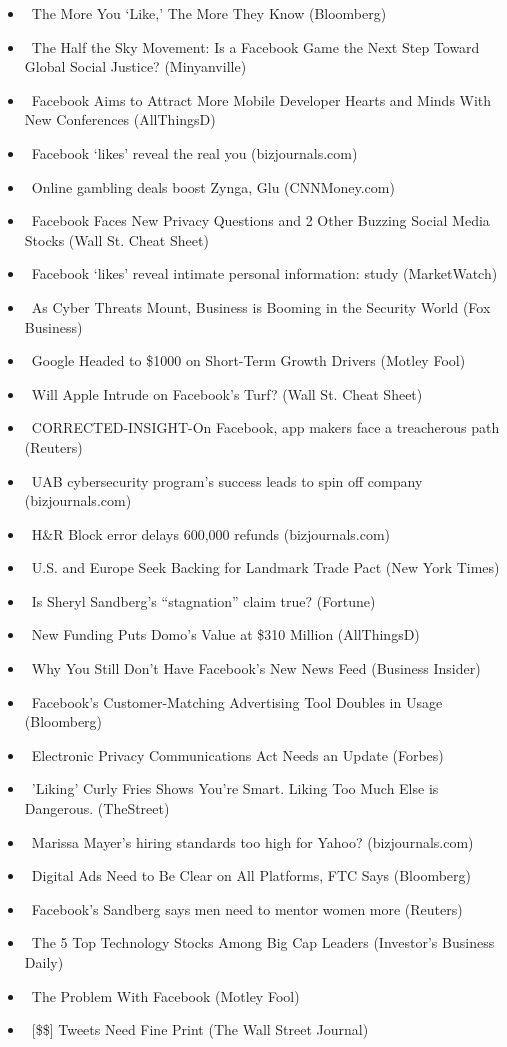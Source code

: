 \documentclass[11pt,asymmetric]{article}
\begin{document}
\begin{itemize}
\item\ The More You `Like,' The More They Know (Bloomberg)
\item\ The Half the Sky Movement: Is a Facebook Game the Next Step Toward Global Social Justice? (Minyanville)
\item\ Facebook Aims to Attract More Mobile Developer Hearts and Minds With New Conferences (AllThingsD)
\item\ Facebook `likes' reveal the real you (bizjournals.com)
\item\ Online gambling deals boost Zynga, Glu (CNNMoney.com)
\item\ Facebook Faces New Privacy Questions and 2 Other Buzzing Social Media Stocks (Wall St. Cheat Sheet)
\item\ Facebook `likes' reveal intimate personal information: study (MarketWatch)
\item\ As Cyber Threats Mount, Business is Booming in the Security World (Fox Business)
\item\ Google Headed to \$1000 on Short-Term Growth Drivers (Motley Fool)
\item\ Will Apple Intrude on Facebook’s Turf? (Wall St. Cheat Sheet)
\item\ CORRECTED-INSIGHT-On Facebook, app makers face a treacherous path (Reuters)
\item\ UAB cybersecurity program's success leads to spin off company (bizjournals.com)
\item\ H\&R Block error delays 600,000 refunds (bizjournals.com)
\item\ U.S. and Europe Seek Backing for Landmark Trade Pact (New York Times)
\item\ Is Sheryl Sandberg's ``stagnation'' claim true? (Fortune)
\item\ New Funding Puts Domo's Value at \$310 Million (AllThingsD)
\item\ Why You Still Don't Have Facebook's New News Feed (Business Insider)
\item\ Facebook’s Customer-Matching Advertising Tool Doubles in Usage (Bloomberg)
\item\ Electronic Privacy Communications Act Needs an Update (Forbes)
\item\ 'Liking' Curly Fries Shows You're Smart. Liking Too Much Else is Dangerous. (TheStreet)
\item\ Marissa Mayer's hiring standards too high for Yahoo? (bizjournals.com)
\item\ Digital Ads Need to Be Clear on All Platforms, FTC Says (Bloomberg)
\item\ Facebook's Sandberg says men need to mentor women more (Reuters)
\item\ The 5 Top Technology Stocks Among Big Cap Leaders (Investor's Business Daily)
\item\ The Problem With Facebook (Motley Fool)
\item\ [\$\$] Tweets Need Fine Print (The Wall Street Journal)
\end{itemize}
\end{document}
